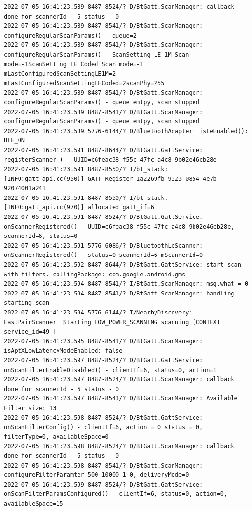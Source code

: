 \documentclass[a4paper,12pt]{book}
\begin{document}
\begin{lstlisting}
2022-07-05 16:41:23.589 8487-8524/? D/BtGatt.ScanManager: callback done for scannerId - 6 status - 0
2022-07-05 16:41:23.589 8487-8541/? D/BtGatt.ScanManager: configureRegularScanParams() - queue=2
2022-07-05 16:41:23.589 8487-8541/? D/BtGatt.ScanManager: configureRegularScanParams() - ScanSetting LE 1M Scan mode=-1ScanSetting LE Coded Scan mode=-1 mLastConfiguredScanSettingLE1M=2 mLastConfiguredScanSettingLECoded=2scanPhy=255
2022-07-05 16:41:23.589 8487-8541/? D/BtGatt.ScanManager: configureRegularScanParams() - queue emtpy, scan stopped
2022-07-05 16:41:23.589 8487-8541/? D/BtGatt.ScanManager: configureRegularScanParams() - queue emtpy, scan stopped
2022-07-05 16:41:23.589 5776-6144/? D/BluetoothAdapter: isLeEnabled(): BLE_ON
2022-07-05 16:41:23.591 8487-8644/? D/BtGatt.GattService: registerScanner() - UUID=c6feac38-f55c-47fc-a4c8-9b02e46cb28e
2022-07-05 16:41:23.591 8487-8550/? I/bt_stack: [INFO:gatt_api.cc(950)] GATT_Register 1a2269fb-9323-0854-4e7b-92074001a241
2022-07-05 16:41:23.591 8487-8550/? I/bt_stack: [INFO:gatt_api.cc(970)] allocated gatt_if=6
2022-07-05 16:41:23.591 8487-8524/? D/BtGatt.GattService: onScannerRegistered() - UUID=c6feac38-f55c-47fc-a4c8-9b02e46cb28e, scannerId=6, status=0
2022-07-05 16:41:23.591 5776-6086/? D/BluetoothLeScanner: onScannerRegistered() - status=0 scannerId=6 mScannerId=0
2022-07-05 16:41:23.592 8487-8644/? D/BtGatt.GattService: start scan with filters. callingPackage: com.google.android.gms
2022-07-05 16:41:23.594 8487-8541/? I/BtGatt.ScanManager: msg.what = 0
2022-07-05 16:41:23.594 8487-8541/? D/BtGatt.ScanManager: handling starting scan
2022-07-05 16:41:23.594 5776-6144/? I/NearbyDiscovery: FastPairScanner: Starting LOW_POWER_SCANNING scanning [CONTEXT service_id=49 ]
2022-07-05 16:41:23.595 8487-8541/? D/BtGatt.ScanManager: isAptXLowLatencyModeEnabled: false
2022-07-05 16:41:23.597 8487-8524/? D/BtGatt.GattService: onScanFilterEnableDisabled() - clientIf=6, status=0, action=1
2022-07-05 16:41:23.597 8487-8524/? D/BtGatt.ScanManager: callback done for scannerId - 6 status - 0
2022-07-05 16:41:23.597 8487-8541/? D/BtGatt.ScanManager: Available Filter size: 13
2022-07-05 16:41:23.598 8487-8524/? D/BtGatt.GattService: onScanFilterConfig() - clientIf=6, action = 0 status = 0, filterType=0, availableSpace=0
2022-07-05 16:41:23.598 8487-8524/? D/BtGatt.ScanManager: callback done for scannerId - 6 status - 0
2022-07-05 16:41:23.598 8487-8541/? D/BtGatt.ScanManager: configureFilterParamter 500 10000 1 0, deliveryMode=0
2022-07-05 16:41:23.599 8487-8524/? D/BtGatt.GattService: onScanFilterParamsConfigured() - clientIf=6, status=0, action=0, availableSpace=15

\end{lstlisting}
\end{document}
